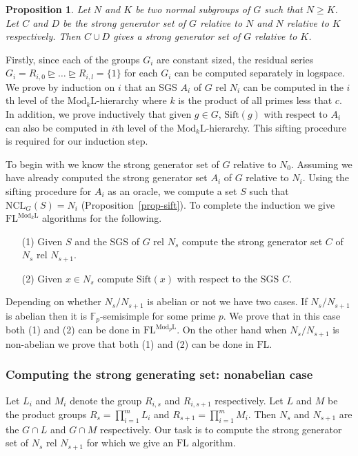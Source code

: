 \documentclass[11pt]{madras}%
\newtheorem{proposition}[theorem]{Proposition}
\theoremstyle{remark}
\newcommand{\ModkL}[1]{{\ensuremath{\mathrm{Mod}_{#1}\mathrm{L}}}}
\newcommand{\NCL}[2][]{\ensuremath{\mathrm{NCL}_{#1}({#2})}}
\newcommand{\Sift}[1]{{\ensuremath{\mathrm{Sift}({#1})}}}
\begin{document}
\begin{proposition}\label{prop-append-sgs}
  Let $N$ and $K$ be two normal subgroups of $G$ such that $N \geq K$.
  Let $C$ and $D$ be the strong generator set of $G$ relative to $N$
  and $N$ relative to $K$ respectively. Then $C \cup D$ gives a strong
  generator set of $G$ relative to $K$.
\end{proposition}


Firstly, since each of the groups $G_i$ are constant sized, the
residual series $G_i = R_{i,0} \unrhd \ldots \unrhd R_{i,l} = \{ 1 \}$
for each $G_i$ can be computed separately in logspace.  We prove by
induction on $i$ that an SGS $A_i$ of $G$ rel $N_i$ can be computed in
the $i$th level of the $\ModkL{k}$-hierarchy where $k$ is the product
of all primes less that $c$. In addition, we prove inductively that
given $g \in G$, $\Sift{g}$ with respect to $A_i$ can also be computed
in $i$th level of the $\ModkL{k}$-hierarchy.  This sifting procedure
is required for our induction step.

To begin with we know the strong generator set of $G$ relative to
$N_0$.  Assuming we have already computed the strong generator set
$A_i$ of $G$ relative to $N_i$. Using the sifting procedure for $A_i$
as an oracle, we compute a set $S$ such that $\NCL[G]{S} = N_i$
(Proposition~\ref{prop-sift}). To complete the induction we give
$\mathrm{FL}^{\ModkL{k}}$ algorithms for the following.
\begin{enumerate}
\item[(1)] Given $S$ and the SGS of $G$ rel $N_s$ compute the strong
  generator set $C$ of $N_s$ rel $N_{s+1}$.
\item[(2)] Given $x \in N_s$ compute $\Sift{x}$ with respect to the SGS
  $C$.
\end{enumerate}

Depending on whether $N_s/N_{s+1}$ is abelian or not we have two
cases. If $N_s/N_{s+1}$ is abelian then it is
$\mathbb{F}_p$-semisimple for some prime $p$. We prove that in this
case both (1) and (2) can be done in $\mathrm{FL}^{\ModkL{p}}$.  On
the other hand when $N_s/N_{s+1}$ is non-abelian we prove that both
(1) and (2) can be done in $\mathrm{FL}$.

\subsubsection{Computing the strong generating set: nonabelian case}

Let $L_i$ and $M_i$ denote the group $R_{i,s}$ and $R_{i,s+1}$
respectively. Let $L$ and $M$ be the product groups $R_s = \prod_{i
  =1}^m L_i$ and $R_{s+1} = \prod_{i = 1}^m M_i$. Then $N_s$ and
$N_{s+1}$ are the $G \cap L$ and $G \cap M$ respectively. Our task is
to compute the strong generator set of $N_s$ rel $N_{s+1}$ for which
we give an $\mathrm{FL}$ algorithm.
\end{document}
